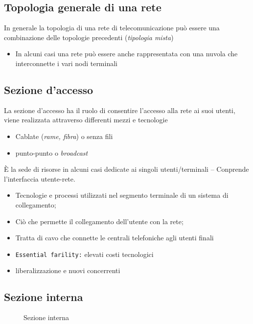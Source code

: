 \subsection{Topologia generale di una rete}
\label{sec:topgenret}

In generale la topologia di una rete di telecomunicazione può essere una combinazione delle topologie precedenti
({\it tipologia mista})
\begin{itemize}
\item In alcuni casi una rete può essere anche rappresentata con una nuvola che interconnette i vari
  nodi terminali
\end{itemize}

\subsection{Sezione d'accesso}
\label{sec:sezioned'accesso}
La sezione d'accesso ha il ruolo di consentire l'accesso alla rete ai suoi utenti, viene realizzata attraverso
differenti mezzi e tecnologie
\begin{itemize}
\item Cablate (\textit{rame, fibra}) o senza fili
\item punto-punto o \textit{broadcast}
\end{itemize}
È la sede di risorse in alcuni casi dedicate ai singoli utenti/terminali -- Conprende l'interfaccia utente-rete.
\begin{itemize}
\item Tecnologie e processi utilizzati nel segmento terminale di un sistema di collegamento;
\item Ciò che permette il collegamento dell'utente con la rete;
\item Tratta di cavo che connette le centrali telefoniche agli utenti finali
\item \texttt{Essential farility:} elevati costi tecnologici
\item liberalizzazione e nuovi concerrenti
\end{itemize}

\subsection{Sezione interna}
\label{sec:sezint}
\begin{figure}[ht]
  \centering
  
  \caption{Sezione interna}
  \label{fig:sezint}
\end{figure}

